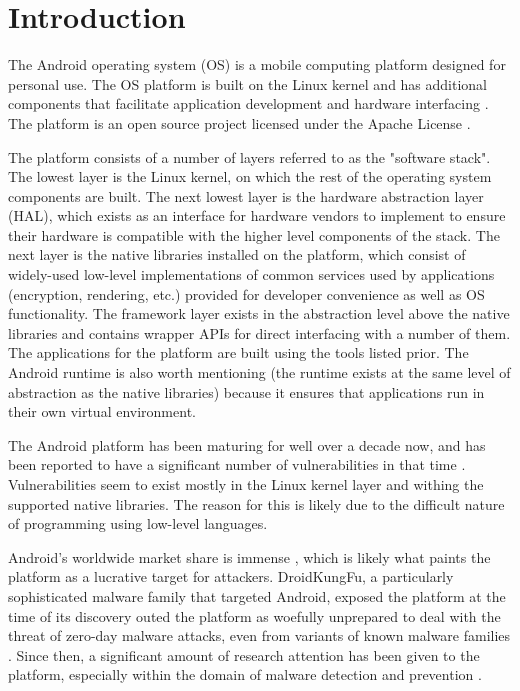 \section{Introduction}
The Android operating system (OS) is a mobile computing platform designed for personal use.
The OS platform is built on the Linux kernel and has additional components that facilitate application development and hardware interfacing \cite{AndroidDocs2022Arch}.
The platform is an open source project licensed under the Apache License \cite{Gilski2015}.

The platform consists of a number of layers referred to as the "software stack".
The lowest layer is the Linux kernel, on which the rest of the operating system components are built.
The next lowest layer is the hardware abstraction layer (HAL), which exists as an interface for hardware vendors to implement to ensure their hardware is compatible with the higher level components of the stack.
The next layer is the native libraries installed on the platform, which consist of widely-used low-level implementations of common services used by applications (encryption, rendering, etc.) provided for developer convenience as well as OS functionality.
The framework layer exists in the abstraction level above the native libraries and contains wrapper APIs for direct interfacing with a number of them.
The applications for the platform are built using the tools listed prior.
The Android runtime is also worth mentioning (the runtime exists at the same level of abstraction as the native libraries) because it ensures that applications run in their own virtual environment.

The Android platform has been maturing for well over a decade now, and has been reported to have a significant number of vulnerabilities in that time \cite{LinaresVasquez2017, Wu2019}.
Vulnerabilities seem to exist mostly in the Linux kernel layer and withing the supported native libraries.
The reason for this is likely due to the difficult nature of programming using low-level languages.

Android's worldwide market share is immense \cite{AndroidMarketShare2021}, which is likely what paints the platform as a lucrative target for attackers.
DroidKungFu, a particularly sophisticated malware family that targeted Android, exposed the platform at the time of its discovery outed the platform as woefully unprepared to deal with the threat of zero-day malware attacks, even from variants of known malware families \cite{Zhou2012}.
Since then, a significant amount of research attention has been given to the platform, especially within the domain of malware detection and prevention \cite{Faruki2015, Bhat2020}.

